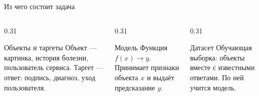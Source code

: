 \begin{frame}[c]{Из чего состоит задача}
  \centering

  \medskip
  \begin{columns}[T]
    \begin{column}{0.31\textwidth}
      \begin{block}{Объекты и таргеты}
        Объект --- картинка, история болезни, пользователь сервиса.
        Таргет --- ответ: подпись, диагноз, уход пользователя.
      \end{block}
    \end{column}
    \begin{column}{0.31\textwidth}
      \begin{block}{Модель}
        Функция $f(x) \to y$. Принимает признаки объекта $x$ и выдаёт предсказание $y$.
      \end{block}
    \end{column}
    \begin{column}{0.31\textwidth}
      \begin{block}{Датасет}
        Обучающая выборка: объекты вместе с известными ответами. По ней учится модель.
      \end{block}
    \end{column}
  \end{columns}
\end{frame}
